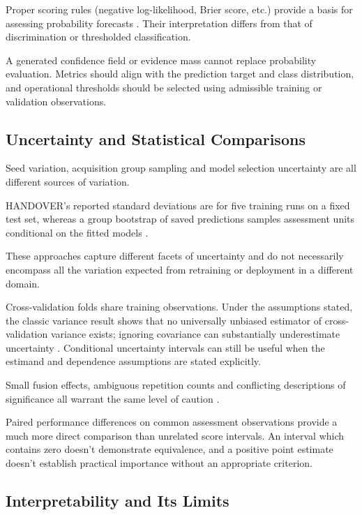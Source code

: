 Proper scoring rules (negative log-likelihood, Brier score, etc.) provide a basis for assessing
probability forecasts \parencite{P055}. Their interpretation differs from that of discrimination or
thresholded classification.

A generated confidence field or evidence mass cannot replace probability evaluation. Metrics should
align with the prediction target and class distribution, and operational thresholds should be
selected using admissible training or validation observations.

\subsection{Uncertainty and Statistical Comparisons}

Seed variation, acquisition group sampling and model selection uncertainty are all different sources
of variation.

HANDOVER's reported standard deviations are for five training runs on a fixed test set, whereas a
group bootstrap of saved predictions samples assessment units conditional on the fitted models
\parencite{Thoduka2024Handover}.

These approaches capture different facets of uncertainty and do not necessarily encompass all the
variation expected from retraining or deployment in a different domain.

Cross-validation folds share training observations. Under the assumptions stated, the classic
variance result shows that no universally unbiased estimator of cross-validation variance exists;
ignoring covariance can substantially underestimate uncertainty \parencite[pp.~1096--1098, 1102--1104]{Bengio2004CVVariance}. Conditional uncertainty intervals can still be useful when the
estimand and dependence assumptions are stated explicitly.

Small fusion effects, ambiguous repetition counts and conflicting descriptions of significance all
warrant the same level of caution \parencite{Gu2024Improved,Xu2025ModalityResilient}.

Paired performance differences on common assessment observations provide a much more direct
comparison than unrelated score intervals. An interval which contains zero doesn't demonstrate
equivalence, and a positive point estimate doesn't establish practical importance without an
appropriate criterion.

\subsection{Interpretability and Its Limits}

